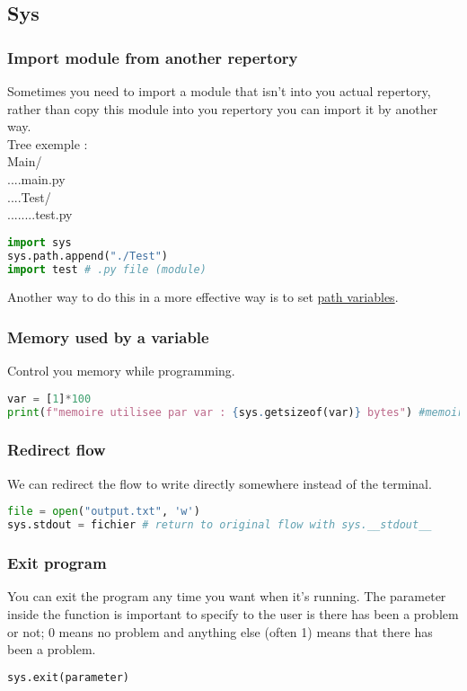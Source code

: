 \documentclass[a4paper, 12pt, titlepage]{scrartcl} %
\begin{document}
\subsection{Sys}
\subsubsection{Import module from another repertory}
Sometimes you need to import a module that isn't into you actual repertory, rather than copy this module into you repertory you can import it by another way. \\

Tree exemple : \\
Main/ \\
....main.py \\
....Test/ \\
........test.py \\

\begin{lstlisting}[language=Python]
import sys
sys.path.append("./Test")
import test # .py file (module)
\end{lstlisting} \vspace{5mm}

Another way to do this in a more effective way is to set \hyperref[subsec:PathVariables]{path variables}.

\subsubsection{Memory used by a variable}
Control you memory while programming. 
\begin{lstlisting}[language=Python]
var = [1]*100
print(f"memoire utilisee par var : {sys.getsizeof(var)} bytes") #memoire utilisee par var : 856 bytes
\end{lstlisting} \vspace{5mm}

\subsubsection{Redirect flow}
We can redirect the flow to write directly somewhere instead of the terminal.
\begin{lstlisting}[language=Python]
file = open("output.txt", 'w')
sys.stdout = fichier # return to original flow with sys.__stdout__
\end{lstlisting} \vspace{5mm}

\subsubsection{Exit program}
You can exit the program any time you want when it's running. The parameter inside the function is important to specify to the user is there has been a problem or not; 0 means no problem and anything else (often 1) means that there has been a problem.
\begin{lstlisting}[language=Python]
sys.exit(parameter)
\end{lstlisting} \vspace{5mm}
\end{document}
